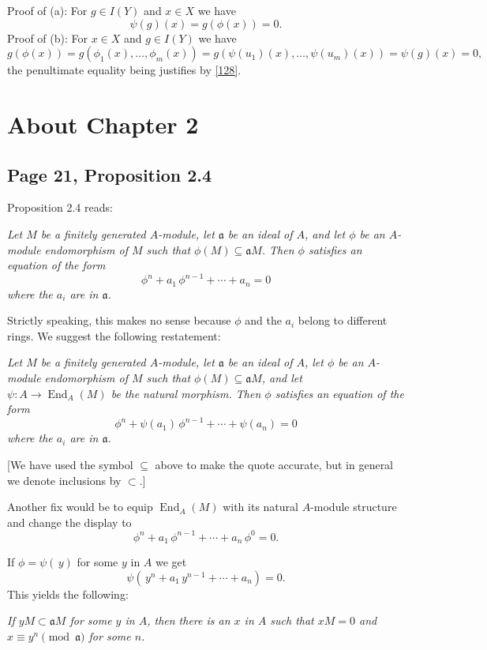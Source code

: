 \documentclass[parskip=half,fontsize=12pt]{scrartcl}%
\newcommand{\oo}{\operatorname}\newcommand{\ooo}{\operatorname*}
\newcommand{\mf}{\mathfrak}
\newcommand{\aaa}{\mf a}
\begin{document}
Proof of (a): For $g\in I(Y)$ and $x\in X$ we have 
$$
\psi(g)(x)=g(\phi(x))=0.
$$ 
Proof of (b): For $x\in X$ and $g\in I(Y)$ we have 
$$
g(\phi(x))=g(\phi_1(x),\dots,\phi_m(x))=g(\psi(u_1)(x),\dots,\psi(u_m)(x))=\psi(g)(x)=0,
$$ 
the penultimate equality being justifies by \eqref{128}.


\section{About Chapter 2}%

\subsection{Page 21, Proposition 2.4}\label{24}%

Proposition 2.4 reads:

\emph{Let $M$ be a finitely generated $A$-module, let $\mf a$ be an ideal of $A$, and let $\phi$ be an $A$-module endomorphism of $M$ such that $\phi(M)\subseteq\aaa M$. Then $\phi$ satisfies an equation of the form
$$
\phi^n+a_1\,\phi^{n-1}+\cdots+a_n=0
$$ 
where the $a_i$ are in $\mf a$.}

Strictly speaking, this makes no sense because $\phi$ and the $a_i$ belong to different rings. We suggest the following restatement:

\emph{Let $M$ be a finitely generated $A$-module, let $\aaa$ be an ideal of $A$, let $\phi$ be an $A$-module endomorphism of $M$ such that $\phi(M)\subseteq\aaa M$, and let $\psi:A\to\oo{End}_A(M)$ be the natural morphism. Then $\phi$ satisfies an equation of the form
$$
\phi^n+\psi(a_1)\,\phi^{n-1}+\cdots+\psi(a_n)=0
$$ 
where the $a_i$ are in $\aaa$.}

[We have used the symbol $\subseteq$ above to make the quote accurate, but in general we denote inclusions by $\subset$.]

Another fix would be to equip $\operatorname{End}_A(M)$ with its natural $A$-module structure and change the display to 
$$
\phi^n+a_1\,\phi^{n-1}+\cdots+a_n\,\phi^0=0.
$$

If $\phi=\psi(\,y)$ for some $y$ in $A$ we get 
\begin{equation}\label{2124}
\psi(\,y^n+a_1\,y^{n-1}+\cdots+a_n)=0.
\end{equation}
This yields the following:

\emph{If $yM\subset\aaa M$ for some $y$ in $A$, then there is an $x$ in $A$ such that $xM=0$ and $x\equiv y^n\pmod{\aaa}$ for some $n$.}
\end{document}
